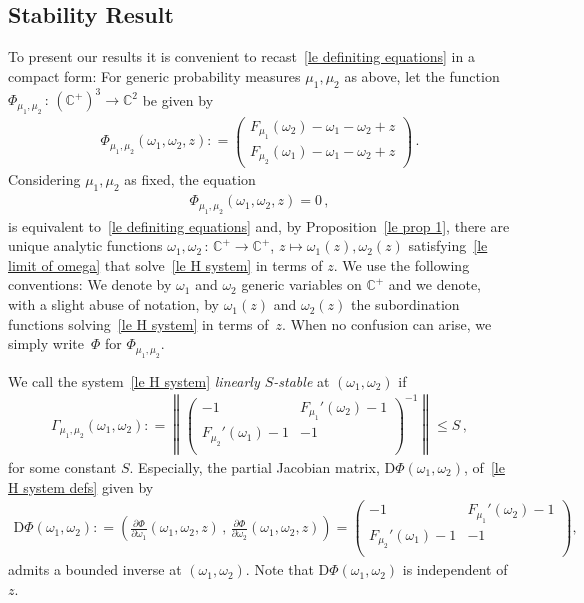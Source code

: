 \documentclass[10pt,reqno]{amsart}
\numberwithin{equation}{section}
\theoremstyle{plain}
\numberwithin{kevin}{section}
\theoremstyle{remark}
\newcommand{\C}{{\mathbb C}}
\newcommand{\deq}{\mathrel{\mathop:}=}
\newcommand{\PP}{\Phi}
\begin{document}
\subsection{Stability Result}
To present our results it is convenient to recast~\eqref{le definiting equations} in a compact form: For generic probability measures $\mu_1,\mu_2$ as above, let the function $\PP_{\mu_1,\mu_2}\,:\, (\C^+)^{3}\rightarrow \C^2$ be given by
\begin{align}\label{le H system defs}
\PP_{\mu_1,\mu_2}(\omega_1,\omega_2,z)\deq\left(\begin{array}{cc} F_{\mu_1}(\omega_2)-\omega_1-\omega_2+z \\ F_{\mu_2}(\omega_1)-\omega_1-\omega_2+z \end{array}\right)\,.
\end{align}
Considering $\mu_1,\mu_2$ as fixed, the equation
\begin{align}\label{le H system}
\PP_{\mu_1,\mu_2}(\omega_1,\omega_2,z)=0\,,
\end{align}
is equivalent to~\eqref{le definiting equations} and, by Proposition~\ref{le prop 1}, there are unique analytic functions $\omega_1,\omega_2\,:\, \C^+\rightarrow \C^+$, $z\mapsto \omega_1(z),\omega_2(z)$ satisfying~\eqref{le limit of omega} that solve~\eqref{le H system} in terms of $z$. We use the following conventions: We denote by $\omega_1$ and $\omega_2$ generic variables on $\C^+$ and we denote, with a slight abuse of notation, by $\omega_1(z)$ and $\omega_2(z)$ the subordination functions solving~\eqref{le H system} in terms of~$z$. When no confusion can arise, we simply write~$\PP$ for $\PP_{\mu_1,\mu_2}$. 

We call the system~\eqref{le H system} {\it linearly $S$-stable} at $(\omega_1,\omega_2)$ if
\begin{align}\label{le what stable means}
\Gamma_{\mu_1,\mu_2}(\omega_1,\omega_2)\deq \left\|\left(\begin{array}{cc}
-1& F_{\mu_1}'(\omega_2)-1  \\
F_{\mu_2}'(\omega_1)-1& -1\\
  \end{array}\right)^{-1} \right\|\le S\,,
\end{align}
for some constant $S$. Especially, the partial Jacobian matrix, $\mathrm{D}\PP(\omega_1,\omega_2)$, of~\eqref{le H system defs} given by
\begin{align*}
 \mathrm{D}\PP(\omega_1,\omega_2)\deq\left(\frac{\partial \PP}{\partial \omega_1}(\omega_1,\omega_2,z) \,,\,\frac{\partial \PP}{\partial\omega_2}(\omega_1,\omega_2,z) \right)=\left(\begin{array}{cc}
-1& F_{\mu_1}'(\omega_2)-1  \\
F_{\mu_2}'(\omega_1)-1 & -1\\
  \end{array}\right),
\end{align*}
admits a bounded inverse at $(\omega_1,\omega_2)$. Note that $ \mathrm{D}\PP(\omega_1,\omega_2)$ is independent of $z$. 
\end{document}
